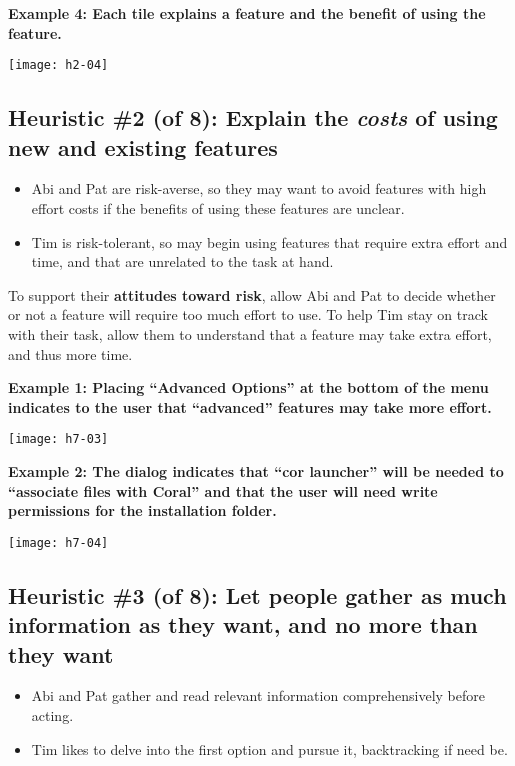 \noindent\textbf{Example 4: Each tile explains a feature and the benefit of using the feature.}
\begin{center}
\noindent\texttt{[image: h2-04]}
\end{center}

\subsection{Heuristic \#2 (of 8): Explain the \textit{costs} of using new and existing features}

\begin{itemize}
    \item Abi and Pat are risk-averse, so they may want to avoid features with high effort costs if the benefits of using these features are unclear.
    \item Tim is risk-tolerant, so may begin using features that require extra effort and time, and that are unrelated to the task at hand.
\end{itemize}

\noindent To support their \textbf{attitudes toward risk}, allow Abi and Pat to decide whether or not a feature will require too much effort to use. To help Tim stay on track with their task, allow them to understand that a feature may take extra effort, and thus more time.

\spacer
\noindent\textbf{Example 1: Placing ``Advanced Options'' at the bottom of the menu indicates to the user that ``advanced'' features may take more effort.}\\
\begin{center}
\noindent\texttt{[image: h7-03]}
\end{center}

\noindent\textbf{Example 2: The dialog indicates that ``cor launcher'' will be needed to ``associate files with Coral'' and that the user will need write permissions for the installation folder.}\\
\begin{center}
\noindent\texttt{[image: h7-04]}
\end{center}

\subsection{Heuristic \#3 (of 8): Let people gather as much information as they want, and no more than they want}

\begin{itemize}
\item Abi and Pat gather and read relevant information comprehensively before acting.
\item Tim likes to delve into the first option and pursue it, backtracking if need be.
\end{itemize}


